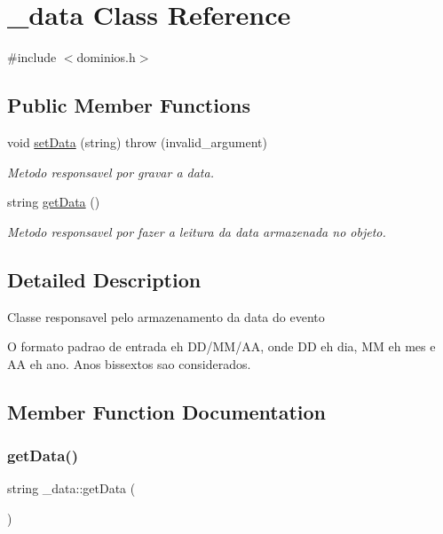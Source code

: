 \hypertarget{class__data}{}\section{\+\_\+data Class Reference}
\label{class__data}


{\ttfamily \#include $<$dominios.\+h$>$}

\subsection*{Public Member Functions}
\begin{DoxyCompactItemize}
\item 
void \mbox{\hyperlink{class__data_a12f8f576e3d375bd9523c24c1fb24616}{set\+Data}} (string)  throw (invalid\+\_\+argument)
\begin{DoxyCompactList}\small\item\em Metodo responsavel por gravar a data. \end{DoxyCompactList}\item 
string \mbox{\hyperlink{class__data_a105e568d436e06acbd35bd1cffe97dab}{get\+Data}} ()
\begin{DoxyCompactList}\small\item\em Metodo responsavel por fazer a leitura da data armazenada no objeto. \end{DoxyCompactList}\end{DoxyCompactItemize}


\subsection{Detailed Description}
Classe responsavel pelo armazenamento da data do evento

O formato padrao de entrada eh D\+D/\+M\+M/\+AA, onde DD eh dia, MM eh mes e AA eh ano. Anos bissextos sao considerados. 

\subsection{Member Function Documentation}
\mbox{\label{class__data_a105e568d436e06acbd35bd1cffe97dab}} 
\subsubsection{\texorpdfstring{getData()}{getData()}}
{\footnotesize\ttfamily string \+\_\+data\+::get\+Data (\begin{DoxyParamCaption}{ }\end{DoxyParamCaption})\hspace{0.3cm}{\ttfamily [inline]}}



